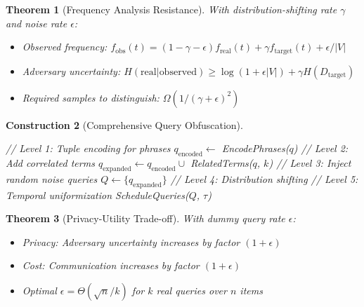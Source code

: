 \documentclass[11pt,final,hidelinks]{article}
\newtheorem{theorem}{Theorem}[section]
\newtheorem{construction}[theorem]{Construction}
\begin{document}
\begin{theorem}[Frequency Analysis Resistance]
With distribution-shifting rate $\gamma$ and noise rate $\epsilon$:
\begin{itemize}
    \item Observed frequency: $f_{\text{obs}}(t) = (1-\gamma-\epsilon)f_{\text{real}}(t) + \gamma f_{\text{target}}(t) + \epsilon/|V|$
    \item Adversary uncertainty: $H(\text{real}|\text{observed}) \geq \log(1 + \epsilon|V|) + \gamma H(D_{\text{target}})$
    \item Required samples to distinguish: $\Omega(1/(\gamma + \epsilon)^2)$
\end{itemize}
\end{theorem}

\begin{construction}[Comprehensive Query Obfuscation]
\begin{algorithm}[H]
\caption{Multi-Level Query Obfuscation with All Strategies}
// Level 1: Tuple encoding for phrases\;
$q_{\text{encoded}} \gets$ EncodePhrases($q$)\;
// Level 2: Add correlated terms\;
$q_{\text{expanded}} \gets q_{\text{encoded}} \cup$ RelatedTerms($q$, $k$)\;
// Level 3: Inject random noise queries\;
$Q \gets \{q_{\text{expanded}}\}$\;
// Level 4: Distribution shifting\;
// Level 5: Temporal uniformization\;
ScheduleQueries($Q$, $\tau$)\;
\end{algorithm}
\end{construction}

\begin{theorem}[Privacy-Utility Trade-off]
With dummy query rate $\epsilon$:
\begin{itemize}
    \item Privacy: Adversary uncertainty increases by factor $(1 + \epsilon)$
    \item Cost: Communication increases by factor $(1 + \epsilon)$
    \item Optimal $\epsilon = \Theta(\sqrt{n}/k)$ for $k$ real queries over $n$ items
\end{itemize}
\end{theorem}
\end{document}
